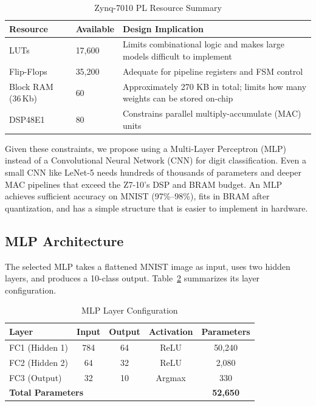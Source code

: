 \documentclass[12pt, letterpaper]{article}
\begin{document}
\begin{table}[H]
\centering
\caption{Zynq-7010 PL Resource Summary}
\label{tab:zynq7010_resources}
\begin{tabular}{llp{8.5cm}}
\toprule
\textbf{Resource} & \textbf{Available} & \textbf{Design Implication} \\
\midrule
LUTs               & 17,600 & Limits combinational logic and makes large models difficult to implement \\
Flip-Flops         & 35,200 & Adequate for pipeline registers and FSM control \\
Block RAM (36\,Kb) & 60     & Approximately 270 KB in total; limits how many weights can be stored on-chip \\
DSP48E1            & 80     & Constrains parallel multiply-accumulate (MAC) units \\
\bottomrule
\end{tabular}
\end{table}

Given these constraints, we propose using a Multi-Layer Perceptron (MLP) instead of
a Convolutional Neural Network (CNN) for digit classification. Even a small CNN like LeNet-5 needs hundreds of thousands of parameters
and deeper MAC pipelines that exceed the Z7-10's DSP and BRAM budget. An MLP achieves sufficient accuracy
on MNIST (97\%--98\%), fits in BRAM after quantization, and has a simple structure that is easier to
implement in hardware.

\subsection{MLP Architecture}

The selected MLP takes a flattened MNIST image as input, uses two hidden layers, and produces a 10-class output.
Table~\ref{tab:mlp_layers} summarizes its layer configuration.

\begin{table}[H]
\centering
\caption{MLP Layer Configuration}
\label{tab:mlp_layers}
\begin{tabular}{lcccc}
\toprule
\textbf{Layer} & \textbf{Input} & \textbf{Output} & \textbf{Activation} & \textbf{Parameters} \\
\midrule
FC1 (Hidden 1) & 784 & 64 & ReLU   & 50,240 \\
FC2 (Hidden 2) & 64  & 32 & ReLU   & 2,080  \\
FC3 (Output)   & 32  & 10 & Argmax & 330    \\
\midrule
\multicolumn{4}{l}{\textbf{Total Parameters}} & \textbf{52,650} \\
\bottomrule
\end{tabular}
\end{table}
\end{document}
